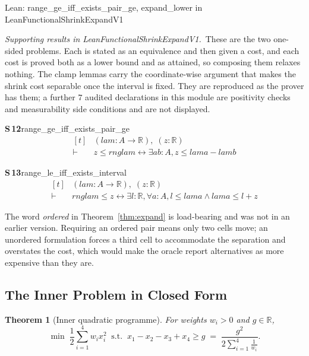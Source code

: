 \documentclass[conference]{IEEEtran}
\newtheorem{theorem}{Theorem}
\theoremstyle{definition}
\newcommand{\lean}[1]{\textsf{\footnotesize #1}}
\newcommand{\leanbox}[1]{%
  \par\vspace{2pt}\noindent
  {\footnotesize\textsf{Lean: #1}}\par\vspace{2pt}}
\begin{document}
\leanbox{\lean{range\_ge\_iff\_exists\_pair\_ge}, \lean{expand\_lower} in
\lean{LeanFunctionalShrinkExpandV1}}

\noindent\emph{Supporting results in \lean{LeanFunctionalShrinkExpandV1}.}~These are the two one-sided problems. Each is stated as an equivalence and then given a cost, and each cost is proved both as a lower bound and as attained, so composing them relaxes nothing. The clamp lemmas carry the coordinate-wise argument that makes the shrink cost separable once the interval is fixed. They are reproduced as the prover has them; a further $7$ audited declarations in this module are positivity checks and measurability side conditions and are not displayed.

\noindent\textbf{S\,12}\quad\lean{range\_ge\_iff\_exists\_pair\_ge}
{\footnotesize\[ \begin{aligned}[t]
&(\mathit{lam} : \mathit{A} \to \mathbb{R} ),\; (\mathit{z} : \mathbb{R} )\\
\vdash\;&\mathit{z} \leq \mathit{rng} \mathit{lam} \leftrightarrow \exists \mathit{a} \mathit{b} : \mathit{A}, \mathit{z} \leq \mathit{lam} \mathit{a} - \mathit{lam} \mathit{b}
\end{aligned} \]}

\noindent\textbf{S\,13}\quad\lean{range\_le\_iff\_exists\_interval}
{\footnotesize\[ \begin{aligned}[t]
&(\mathit{lam} : \mathit{A} \to \mathbb{R} ),\; (\mathit{z} : \mathbb{R} )\\
\vdash\;&\mathit{rng} \mathit{lam} \leq \mathit{z} \leftrightarrow \exists \mathit{l} : \mathbb{R} , \forall \mathit{a} : \mathit{A}, \mathit{l} \leq \mathit{lam} \mathit{a} \wedge \mathit{lam} \mathit{a} \leq \mathit{l} + \mathit{z}
\end{aligned} \]}


The word \emph{ordered} in Theorem~\ref{thm:expand} is load-bearing and was not in an earlier
version. Requiring an ordered pair means only two cells move; an unordered formulation forces
a third cell to accommodate the separation and overstates the cost, which would make the
oracle report alternatives as more expensive than they are.

\subsection{The Inner Problem in Closed Form}
\label{sec:innerqp}

\begin{theorem}[Inner quadratic programme]
\label{thm:innerqp}
For weights $w_{i}>0$ and $g\in\mathbb{R}$,
\begin{equation}
\min\;\frac{1}{2}\sum_{i=1}^{4}w_{i}x_{i}^{2}
\;\;\text{s.t.}\;\;x_{1}-x_{2}-x_{3}+x_{4}\geq g
\;=\;
\frac{g^{2}}{2\sum_{i=1}^{4}\frac{1}{w_{i}}} .
\label{eq:innerqp}
\end{equation}
\end{theorem}
\end{document}
